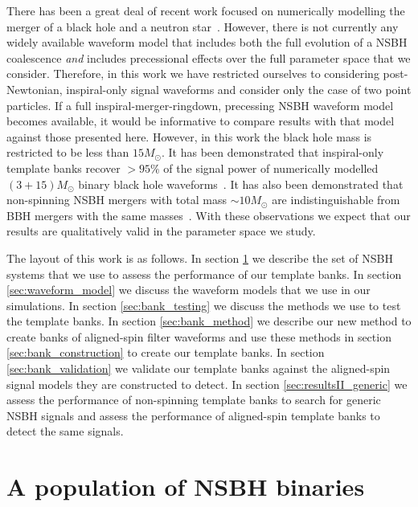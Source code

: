 There has been a great deal of recent work focused on numerically 
modelling the merger of a black hole and a neutron 
star~\cite{Duez:2009yz,Shibata:2011jka,Pannarale:2012ux,Lackey:2013axa,
Foucart:2013psa}. However, there is not currently any widely available waveform 
model 
that includes both the full evolution of a \ac{NSBH} coalescence \emph{and} 
includes precessional effects over the full parameter space that we consider.
Therefore, in this work we have restricted ourselves to considering 
post-Newtonian, inspiral-only signal waveforms and consider only the case of two 
point particles. If a full 
inspiral-merger-ringdown, precessing \ac{NSBH} waveform model 
becomes available, it would be informative to compare results with that model 
against those presented here. However, in this work the black hole mass is 
restricted to be less than $15M_{\odot}$. It has been demonstrated that 
inspiral-only template banks recover $> 95\%$ of the signal power of 
numerically modelled $(3+15)M_{\odot}$ binary black hole 
waveforms~\cite{Brown:2012nn,Smith:2013mfa}. It has also been demonstrated that 
non-spinning \ac{NSBH} mergers with total mass $\sim 10M_{\odot}$ are 
indistinguishable from \ac{BBH} mergers with the same 
masses~\cite{Foucart:2013psa}. With these observations we expect that 
our results are qualitatively valid in the parameter space we study.

The layout of this work is as follows. In section \ref{sec:nsbhpop} we describe
the set of \ac{NSBH} systems that we use to assess
the performance of our template banks. In section \ref{sec:waveform_model} we
discuss the waveform models that we use in our simulations. In section
\ref{sec:bank_testing} we discuss the methods we use to test the template
banks. In section \ref{sec:bank_method} we describe our new method to
create banks of aligned-spin filter waveforms and use these methods in section
\ref{sec:bank_construction} to create our template banks. In section
\ref{sec:bank_validation} we validate our template banks against the
aligned-spin signal models they are constructed to detect. In section
\ref{sec:resultsII_generic} we assess the performance of non-spinning template 
banks to search for generic \ac{NSBH} signals and assess the performance of 
aligned-spin template banks to detect the same signals.

\section{A population of NSBH binaries}
\label{sec:nsbhpop}

